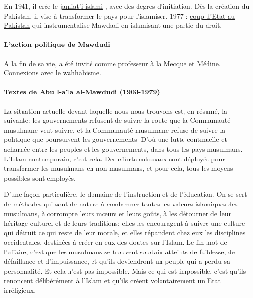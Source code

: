 En 1941, il crée le \href{https://fr.wikipedia.org/wiki/Jamiat-e_Islami}{jamiat'i islami} , avec des degres d'initiation. Dès la création du Pakistan, il vise à transformer le pays pour l'islamiser. 1977 : \href{https://fr.wikipedia.org/wiki/Coup\_d\%27\%C3\%89tat\_du\_5\_juillet\_1977\_au\_Pakistan}{coup d'Etat au Pakistan}  qui instrumentalise Mawdadi en islamisant une partie du droit. 

\paragraph{L'action politique de Mawdudi}

   A la fin de sa vie, a été invité comme professeur à la Mecque et Médine. Connexions avec le wahhabisme.




\paragraph{Textes de Abu l-a'la al-Mawdudi
(1903-1979)}

La situation actuelle devant laquelle nous nous trouvons est, en résumé,
la suivante: les gouvernements refusent de suivre la route que la
Communauté musulmane veut suivre, et la Communauté musulmane refuse de
suivre la politique que poursuivent les gouvernements. D'où une lutte
continuelle et acharnée entre les peuples et les gouvernements, dans
tous les pays musulmans. L'Islam contemporain, c'est cela. Des efforts
colossaux sont déployés pour transformer les musulmans en non-musulmans,
et pour cela, tous les moyens possibles sont employés.

D'une façon particulière, le domaine de l'instruction et de l'éducation.
On se sert de méthodes qui sont de nature à condamner toutes les valeurs
islamiques des musulmans, à corrompre leurs mœurs et leurs goûts, à les
détourner de leur héritage culturel et de leurs traditions; elles les
encouragent à suivre une culture qui détruit ce qui reste de leur
morale, et elles répandent chez eux les disciplines occidentales,
destinées à créer en eux des doutes sur l'Islam. Le fin mot de
l'affaire, c'est que les musulmans se trouvent soudain atteints de
faiblesse, de défaillance et d'impuissance, et qu'ils deviendront un
peuple qui a perdu sa personnalité. Et cela n'est pas impossible. Mais
ce qui est impossible, c'est qu'ils renoncent délibérément à l'Islam et
qu'ils créent volontairement un Etat irréligieux.


